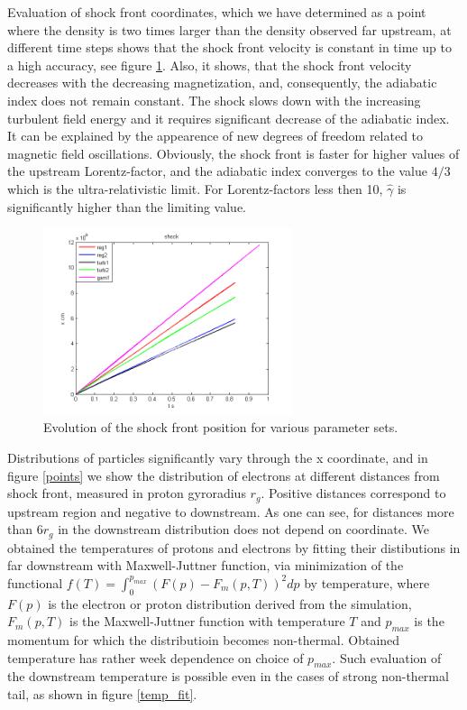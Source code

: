 \documentclass[a4paper]{jpconf}
\begin{document}
	Evaluation of shock front coordinates, which we have determined as a point where  the density is two times larger than the density observed far upstream, at different time steps shows that the shock front velocity is constant in time up to a high accuracy, see figure \ref{shock_x}. Also, it shows, that the shock front velocity decreases with the decreasing magnetization, and, consequently, the adiabatic index does not remain constant. The shock slows down with the increasing turbulent field energy and it requires significant decrease of the adiabatic index. It can be explained by the appearence of new degrees of freedom related to magnetic field oscillations. Obviously, the shock front is faster for higher values of the upstream Lorentz-factor, and the adiabatic index  converges to the value $4/3$ which is the ultra-relativistic limit. For Lorentz-factors less then 10, $\hat{\gamma}$ is significantly higher than the limiting value. 
	
	
	\begin{figure}[h!]
		\centering
		\includegraphics[width=0.65\textwidth]{fig/shock_x.png} 
		\caption{Evolution of the shock front position for various parameter sets.}
		\label{shock_x}
	\end{figure}
	
	Distributions of particles significantly vary through the x coordinate, and in figure \ref{points} we show the distribution of electrons at different distances from shock front, measured in proton gyroradius $r_g$. Positive distances correspond to upstream region and negative to downstream. As one can see, for distances more than $6 r_g$ in the downstream distribution does not depend on coordinate.  We obtained the temperatures of protons and electrons by fitting their distibutions in far downstream with Maxwell-Juttner function, via minimization of the functional $f(T) = \int_{0}^{p_{max}} (F(p) - F_{m}(p,T))^2dp$ by temperature, where $F(p)$ is the electron or proton distribution derived from the simulation, $F_{m}(p,T)$ is the Maxwell-Juttner function with temperature $T$ and $p_{max}$ is the momentum for which the distributioin becomes non-thermal. Obtained temperature has rather week dependence on choice of $p_{max}$. Such evaluation of the downstream temperature is possible even in the cases of strong non-thermal tail, as shown in figure \ref{temp_fit}.
	
\end{document}
